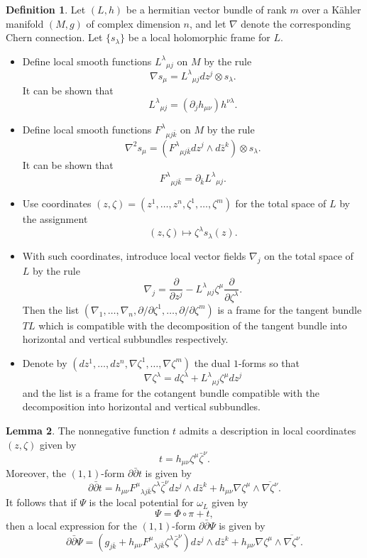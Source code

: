 \documentclass{article}
\numberwithin{equation}{section}
\theoremstyle{definition}
\newtheorem{definition}{Definition}[section]
\theoremstyle{theorem}
\newtheorem{lemma}[definition]{Lemma}
\newcommand{\ddb}{\partial\bar{\partial}}
\begin{document}
\begin{definition}
Let $(L,h)$ be a hermitian vector bundle of rank $m$ over a K\"ahler manifold $(M,g)$ of complex dimension $n$, and let $\nabla$ denote the corresponding Chern connection. Let $\{s_\lambda\}$ be a local holomorphic frame for $L$. 
\begin{itemize}
\item Define local smooth functions $L^\lambda{}_{\mu j}$ on $M$ by the rule 
\[
\nabla s_\mu = L^\lambda{}_{\mu j} dz^j \otimes s_\lambda. 
\]
It can be shown that 
\[
L^\lambda{}_{\mu j} = (\partial_j h_{\mu \nu}) h^{\nu \lambda}.
\]
\item Define local smooth functions $F^\lambda{}_{\mu j \bar{k}}$ on $M$ by the rule 
\[
\nabla^2 s_\mu = (F^\lambda{}_{\mu j \bar{k}} dz^j \wedge d\bar{z}^k) \otimes s_\lambda.
\]
It can be shown that 
\[
F^\lambda{}_{\mu j\bar{k}} = \partial_{\bar{k}} L^\lambda{}_{\mu j}. 
\]
\item Use coordinates $(z,\zeta) = (z^1, \ldots, z^n, \zeta^1, \ldots, \zeta^m)$ for the total space of $L$ by the assignment 
\[
(z, \zeta) \mapsto \zeta^\lambda s_\lambda(z).
\]
\item With such coordinates, introduce local vector fields $\nabla_j$ on the total space of $L$ by the rule 
\[
\nabla_j = \frac{\partial}{\partial z^j} - L^\lambda{}_{\mu j} \zeta^\mu \frac{\partial}{\partial \zeta^\lambda}.
\]
Then the list $(\nabla_1, \ldots, \nabla_n, \partial/\partial \zeta^1, \ldots, \partial/\partial \zeta^m)$ is a frame for the tangent bundle $TL$ which is compatible with the decomposition of the tangent bundle into horizontal and vertical subbundles respectively. 
\item Denote by $(dz^1, \ldots, dz^n, \nabla \zeta^1, \ldots, \nabla \zeta^m)$ the dual $1$-forms so that 
\[
\nabla \zeta^\lambda = d\zeta^\lambda + L^{\lambda}{}_{\mu j} \zeta^\mu dz^j
\]
and the list is a frame for the cotangent bundle compatible with the decomposition into horizontal and vertical subbundles. 
\end{itemize} 
\end{definition}

\begin{lemma}
The nonnegative function $t$ admits a description in local coordinates $(z, \zeta)$ given by 
\[
t = h_{\mu \nu} \zeta^\mu \bar{\zeta}^\nu.
\]
Moreover, the $(1,1)$-form $\ddb t$ is given by 
\[
\ddb t = h_{\mu \nu}F^\mu{}_{\lambda j\bar{k}} \zeta^\lambda \bar{\zeta}^\nu dz^j \wedge d\bar{z}^k + h_{\mu \nu} \nabla \zeta^\mu \wedge \overline{\nabla \zeta^\nu}.
\]
It follows that if $\Psi$ is the local potential for $\omega_L$ given by 
\[
\Psi = \Phi \circ \pi + t,
\]
then a local expression for the $(1,1)$-form $\ddb \Psi$ is given by 
\[
\ddb \Psi = (g_{j \bar{k}} + h_{\mu \nu}F^\mu{}_{\lambda j\bar{k}} \zeta^\lambda \bar{\zeta}^\nu) dz^j \wedge d\bar{z}^k + h_{\mu \nu} \nabla \zeta^\mu \wedge \overline{\nabla \zeta^\nu}.
\]
\end{lemma}
\end{document}

